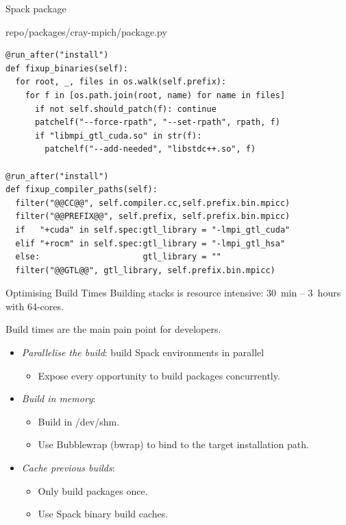 \documentclass[aspectratio=43]{beamer}
\begin{document}
\begin{frame}[fragile]{Spack package}

\begin{code}{repo/packages/cray-mpich/package.py}
    \begin{lstlisting}[style=talkbash]
@run_after("install")
def fixup_binaries(self):
  for root, _, files in os.walk(self.prefix):
    for f in [os.path.join(root, name) for name in files]
      if not self.should_patch(f): continue
      patchelf("--force-rpath", "--set-rpath", rpath, f)
      if "libmpi_gtl_cuda.so" in str(f):
        patchelf("--add-needed", "libstdc++.so", f)

@run_after("install")
def fixup_compiler_paths(self):
  filter("@@CC@@", self.compiler.cc,self.prefix.bin.mpicc)
  filter("@@PREFIX@@", self.prefix, self.prefix.bin.mpicc)
  if   "+cuda" in self.spec:gtl_library = "-lmpi_gtl_cuda"
  elif "+rocm" in self.spec:gtl_library = "-lmpi_gtl_hsa"
  else:                     gtl_library = ""
  filter("@@GTL@@", gtl_library, self.prefix.bin.mpicc) \end{lstlisting}
\end{code}

\end{frame}

\begin{frame}[fragile]{Optimising Build Times}
    Building stacks is resource intensive: 30~min -- 3~hours with 64-cores.

    \vspace{10pt}

    Build times are the main pain point for developers.

    \vspace{10pt}

    \begin{itemize}
        \item \emph{Parallelise the build}: build Spack environments in parallel
        \begin{itemize}
            \item Expose every opportunity to build packages concurrently.
        \end{itemize}
        \item \emph{Build in memory}:
        \begin{itemize}
            \item Build in /dev/shm.
            \item Use Bubblewrap (bwrap) to bind to the target installation path.
        \end{itemize}
        \item \emph{Cache previous builds}:
        \begin{itemize}
            \item Only build packages once.
            \item Use Spack binary build caches.
        \end{itemize}
    \end{itemize}
\end{frame}
\end{document}
